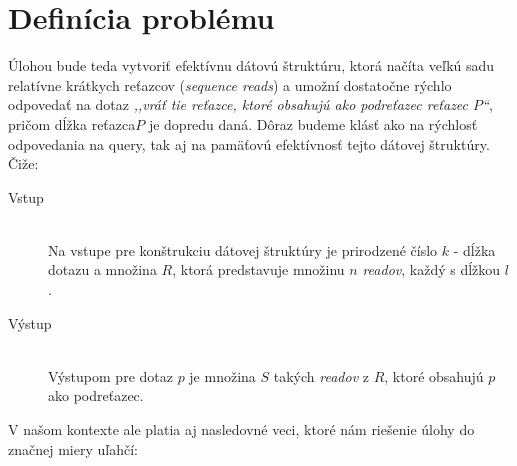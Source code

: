 
\section{Definícia problému}

Úlohou bude teda vytvoriť efektívnu dátovú štruktúru, ktorá načíta veľkú sadu
relatívne krátkych reťazcov (\emph{sequence reads}) a umožní dostatočne rýchlo odpovedať na dotaz \emph{,,vráť tie
reťazce, ktoré obsahujú ako podreťazec reťazec $P$``}, pričom dĺžka reťazca$P$
je dopredu daná. Dôraz budeme klásť ako na rýchlosť odpovedania na query, tak aj
na pamäťovú efektívnosť tejto dátovej štruktúry. Čiže:

\begin{description}
    \item[Vstup] \hfill \\
        Na vstupe pre konštrukciu dátovej štruktúry je prirodzené číslo $k$ -
        dĺžka dotazu a množina $R$, ktorá predstavuje množinu $n$ \emph{readov},
        každý s dĺžkou $l$.
    \item[Výstup] \hfill \\
        Výstupom pre dotaz $p$ je množina $S$ takých \emph{readov} z $R$, ktoré
        obsahujú $p$ ako podreťazec.
\end{description}

V našom kontexte ale platia aj nasledovné veci, ktoré nám riešenie úlohy do
značnej miery uľahčí:

